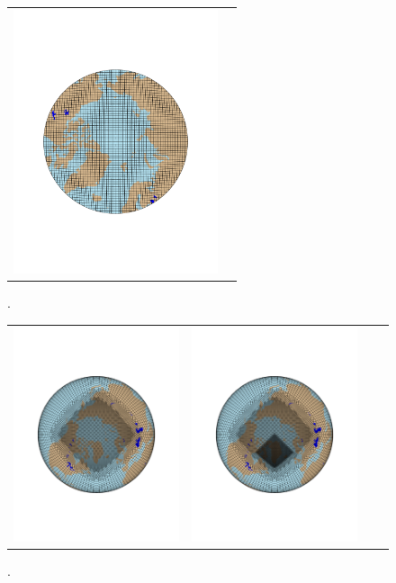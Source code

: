 \documentclass[draft]{agujournal2019}
\begin{document}
\begin{figure}[t]
\begin{center}
\begin{tabular}{cc}
         \includegraphics[width=60mm]{figs/grid-ne30pg3.pdf} \\
\end{tabular}
\end{center}
\caption{.}
\label{fig:uni-grids}
\end{figure}

\begin{figure}[t]
\begin{center}
\begin{tabular}{cccc}
         \includegraphics[width=60mm]{figs/grid-ARCTIC.pdf}&
         \includegraphics[width=60mm]{figs/grid-ARCTICGRIS.pdf} \\
\end{tabular}
\end{center}
\caption{.}
\label{fig:vr-grids}
\end{figure}
\end{document}
